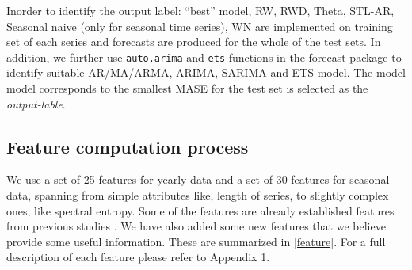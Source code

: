 \documentclass[11pt,a4paper,]{article}
\theoremstyle{definition}
\theoremstyle{definition}
\theoremstyle{definition}
\theoremstyle{remark}
\begin{document}
Inorder to identify the output label: ``best'' model, RW, RWD, Theta,
STL-AR, Seasonal naive (only for seasonal time series), WN are
implemented on training set of each series and forecasts are produced
for the whole of the test sets. In addition, we further use
\texttt{auto.arima} and \texttt{ets} functions in the forecast package
to identify suitable AR/MA/ARMA, ARIMA, SARIMA and ETS model. The model
model corresponds to the smallest MASE \autocite{hyndman2006another} for
the test set is selected as the \emph{output-lable}.

\subsection{Feature computation
process}\label{feature-computation-process}

\label{sec:features}

We use a set of 25 features for yearly data and a set of 30 features for
seasonal data, spanning from simple attributes like, length of series,
to slightly complex ones, like spectral entropy. Some of the features
are already established features from previous studies
\autocites{wang2009rule}{hyndman2015large}{kang2017visualising}. We have
also added some new features that we believe provide some useful
information. These are summarized in \autoref{feature}. For a full
description of each feature please refer to Appendix 1.

\newcommand{\boxedcheckmark}
  {{\ooalign{$\Box$\cr\hidewidth$\checkmark$\hidewidth}}}
\end{document}
